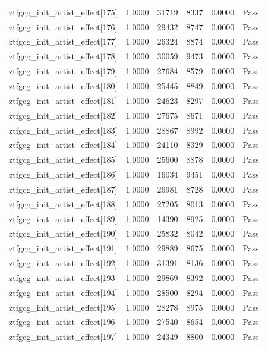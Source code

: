 \begin{table}[htbp]
\begin{tabular}{llrrll}
ztfgcg\_init\_artist\_effect[175] & 1.0000 & 31719 & 8337 & 0.0000 & Pass \\
ztfgcg\_init\_artist\_effect[176] & 1.0000 & 29432 & 8747 & 0.0000 & Pass \\
ztfgcg\_init\_artist\_effect[177] & 1.0000 & 26324 & 8874 & 0.0000 & Pass \\
ztfgcg\_init\_artist\_effect[178] & 1.0000 & 30059 & 9473 & 0.0000 & Pass \\
ztfgcg\_init\_artist\_effect[179] & 1.0000 & 27684 & 8579 & 0.0000 & Pass \\
ztfgcg\_init\_artist\_effect[180] & 1.0000 & 25445 & 8849 & 0.0000 & Pass \\
ztfgcg\_init\_artist\_effect[181] & 1.0000 & 24623 & 8297 & 0.0000 & Pass \\
ztfgcg\_init\_artist\_effect[182] & 1.0000 & 27675 & 8671 & 0.0000 & Pass \\
ztfgcg\_init\_artist\_effect[183] & 1.0000 & 28867 & 8992 & 0.0000 & Pass \\
ztfgcg\_init\_artist\_effect[184] & 1.0000 & 24110 & 8329 & 0.0000 & Pass \\
ztfgcg\_init\_artist\_effect[185] & 1.0000 & 25600 & 8878 & 0.0000 & Pass \\
ztfgcg\_init\_artist\_effect[186] & 1.0000 & 16034 & 9451 & 0.0000 & Pass \\
ztfgcg\_init\_artist\_effect[187] & 1.0000 & 26981 & 8728 & 0.0000 & Pass \\
ztfgcg\_init\_artist\_effect[188] & 1.0000 & 27205 & 8013 & 0.0000 & Pass \\
ztfgcg\_init\_artist\_effect[189] & 1.0000 & 14390 & 8925 & 0.0000 & Pass \\
ztfgcg\_init\_artist\_effect[190] & 1.0000 & 25832 & 8042 & 0.0000 & Pass \\
ztfgcg\_init\_artist\_effect[191] & 1.0000 & 29889 & 8675 & 0.0000 & Pass \\
ztfgcg\_init\_artist\_effect[192] & 1.0000 & 31391 & 8136 & 0.0000 & Pass \\
ztfgcg\_init\_artist\_effect[193] & 1.0000 & 29869 & 8392 & 0.0000 & Pass \\
ztfgcg\_init\_artist\_effect[194] & 1.0000 & 28500 & 8294 & 0.0000 & Pass \\
ztfgcg\_init\_artist\_effect[195] & 1.0000 & 28278 & 8975 & 0.0000 & Pass \\
ztfgcg\_init\_artist\_effect[196] & 1.0000 & 27540 & 8654 & 0.0000 & Pass \\
ztfgcg\_init\_artist\_effect[197] & 1.0000 & 24349 & 8800 & 0.0000 & Pass \\

\end{tabular}
\end{table}
